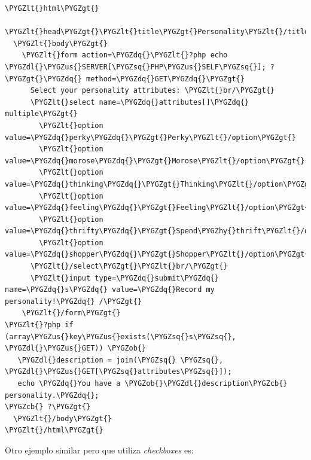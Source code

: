 \documentclass[a5paper,10pt,spanish]{sphinxmanual}
\def\PYGZus{\char`\_}
\def\PYGZob{\char`\{}
\def\PYGZcb{\char`\}}
\def\PYGZlt{\char`\<}
\def\PYGZgt{\char`\>}
\def\PYGZdl{\char`\$}
\def\PYGZhy{\char`\-}
\def\PYGZsq{\char`\'}
\def\PYGZdq{\char`\"}
\begin{document}
\begin{Verbatim}[commandchars=\\\{\}]
\PYGZlt{}html\PYGZgt{}
  \PYGZlt{}head\PYGZgt{}\PYGZlt{}title\PYGZgt{}Personality\PYGZlt{}/title\PYGZgt{}\PYGZlt{}/head\PYGZgt{}
  \PYGZlt{}body\PYGZgt{}
    \PYGZlt{}form action=\PYGZdq{}\PYGZlt{}?php echo \PYGZdl{}\PYGZus{}SERVER[\PYGZsq{}PHP\PYGZus{}SELF\PYGZsq{}]; ?\PYGZgt{}\PYGZdq{} method=\PYGZdq{}GET\PYGZdq{}\PYGZgt{}
      Select your personality attributes: \PYGZlt{}br/\PYGZgt{}
      \PYGZlt{}select name=\PYGZdq{}attributes[]\PYGZdq{} multiple\PYGZgt{}
        \PYGZlt{}option value=\PYGZdq{}perky\PYGZdq{}\PYGZgt{}Perky\PYGZlt{}/option\PYGZgt{}
        \PYGZlt{}option value=\PYGZdq{}morose\PYGZdq{}\PYGZgt{}Morose\PYGZlt{}/option\PYGZgt{}
        \PYGZlt{}option value=\PYGZdq{}thinking\PYGZdq{}\PYGZgt{}Thinking\PYGZlt{}/option\PYGZgt{}
        \PYGZlt{}option value=\PYGZdq{}feeling\PYGZdq{}\PYGZgt{}Feeling\PYGZlt{}/option\PYGZgt{}
        \PYGZlt{}option value=\PYGZdq{}thrifty\PYGZdq{}\PYGZgt{}Spend\PYGZhy{}thrift\PYGZlt{}/option\PYGZgt{}
        \PYGZlt{}option value=\PYGZdq{}shopper\PYGZdq{}\PYGZgt{}Shopper\PYGZlt{}/option\PYGZgt{}
      \PYGZlt{}/select\PYGZgt{}\PYGZlt{}br/\PYGZgt{}
      \PYGZlt{}input type=\PYGZdq{}submit\PYGZdq{} name=\PYGZdq{}s\PYGZdq{} value=\PYGZdq{}Record my personality!\PYGZdq{} /\PYGZgt{}
    \PYGZlt{}/form\PYGZgt{}
\PYGZlt{}?php if (array\PYGZus{}key\PYGZus{}exists(\PYGZsq{}s\PYGZsq{}, \PYGZdl{}\PYGZus{}GET)) \PYGZob{}
   \PYGZdl{}description = join(\PYGZsq{} \PYGZsq{}, \PYGZdl{}\PYGZus{}GET[\PYGZsq{}attributes\PYGZsq{}]);
   echo \PYGZdq{}You have a \PYGZob{}\PYGZdl{}description\PYGZcb{} personality.\PYGZdq{};
\PYGZcb{} ?\PYGZgt{}
  \PYGZlt{}/body\PYGZgt{}
\PYGZlt{}/html\PYGZgt{}
\end{Verbatim}

Otro ejemplo similar pero que utiliza \emph{checkboxes} es:
\end{document}
